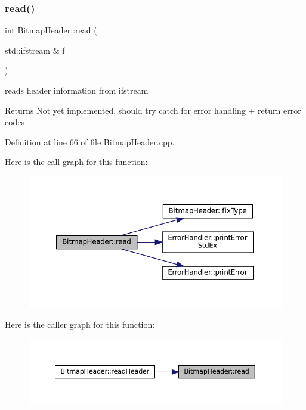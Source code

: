 \subsubsection{\texorpdfstring{read()}{read()}}
{\footnotesize\ttfamily int Bitmap\+Header\+::read (\begin{DoxyParamCaption}\item[{std\+::ifstream \&}]{f }\end{DoxyParamCaption})\hspace{0.3cm}{\ttfamily [private]}}



reads header information from ifstream 

\begin{DoxyReturn}{Returns}
Not yet implemented, should try catch for error handling + return error codes 
\end{DoxyReturn}


Definition at line 66 of file Bitmap\+Header.\+cpp.

Here is the call graph for this function\+:
\nopagebreak
\begin{figure}[H]
\begin{center}
\leavevmode
\includegraphics[width=350pt]{classBitmapHeader_aebc19bf8a908f1f7edfc5b10186c9db8_cgraph}
\end{center}
\end{figure}
Here is the caller graph for this function\+:
\nopagebreak
\begin{figure}[H]
\begin{center}
\leavevmode
\includegraphics[width=350pt]{classBitmapHeader_aebc19bf8a908f1f7edfc5b10186c9db8_icgraph}
\end{center}
\end{figure}
\mbox{\label{classBitmapHeader_a2de360d5111136167f5885bed561bc8c}} 
